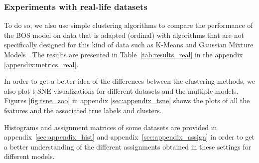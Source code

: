 \subsubsection{Experiments with real-life datasets}
To do so, we also use simple clustering algorithms to compare the performance of the BOS model on data that is adapted (ordinal) with algorithms that are not specifically designed for this kind of data such as K-Means \citep{macqueen1967some} and Gaussian Mixture Models \citep{reynolds2009gaussian}.
The results are presented in Table~\ref{tab:results_real} in the appendix \ref{appendix:metrics_real}.

In order to get a better idea of the differences between the clustering methods, we also plot t-SNE visualizations \citep{van2008visualizing} for different datasets and the multiple models. Figures \ref{fig:tsne_zoo} in appendix \ref{sec:appendix_tsne} shows the plots of all the features and the associated true labels and clusters.

Histograms and assignment matrices of some datasets are provided in appendix~\ref{sec:appendix_hist} and appendix~\ref{sec:appendix_assign} in order to get a better understanding of the different assignments obtained in these settings for different models.






